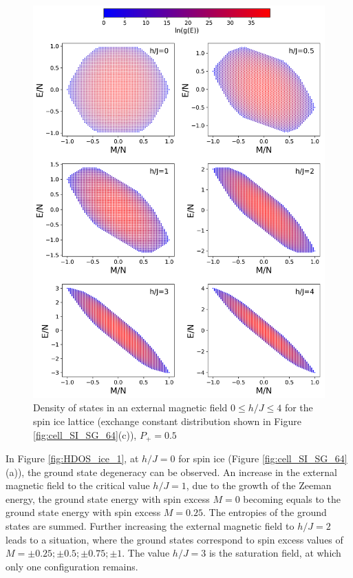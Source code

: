\documentclass[preprint,12pt]{elsarticle}
\begin{document}
\begin{figure}[H]
	\centering
	\includegraphics[width=1\linewidth]{pictures/HDOS_SI_64_J0.png}
	\caption{Density of states in an external magnetic field $0\leq h/J \leq 4$ for the spin ice lattice (exchange constant distribution shown in Figure \ref{fig:cell_SI_SG_64}(c)), $P_+ = 0.5$}
	\label{fig:HDOS_ice}
\end{figure}

In Figure \ref{fig:HDOS_ice_1}, at $h/J=0$ for spin ice (Figure \ref{fig:cell_SI_SG_64}(a)), the ground state degeneracy can be observed. An increase in the external magnetic field to the critical value $h/J=1$, due to the growth of the Zeeman energy, the ground state energy with spin excess $M=0$ becoming equals to the ground state energy with spin excess $M=0.25$. The entropies of the ground states are summed. Further increasing the external magnetic field to $h/J=2$ leads to a situation, where the ground states correspond to spin excess values of $M=\pm0.25; \pm0.5; \pm0.75; \pm1$.
The value  $h/J=3$ is the saturation field, at which only one configuration remains.
\end{document}
